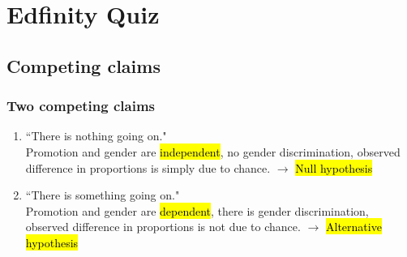 \documentclass[slidestop,compress,mathserif]{beamer}
\begin{document}



\section{Edfinity Quiz}

\subsection{Competing claims}


\begin{frame}
\frametitle{Two competing claims}

\begin{enumerate}

\item ``There is nothing going on." \\
Promotion and gender are \hl{independent}, no gender discrimination, observed difference in proportions is simply due to chance. $\rightarrow$ \hl{Null hypothesis}

\pause

\item ``There is something going on." \\
Promotion and gender are \hl{dependent}, there is gender discrimination, observed difference in proportions is not due to chance. $\rightarrow$ \hl{Alternative hypothesis}

\end{enumerate}

\end{frame}

\end{document}
